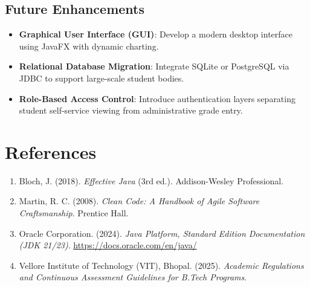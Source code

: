 \documentclass[12pt,a4paper]{report}
\begin{document}
\section{Future Enhancements}
\begin{itemize}
    \item \textbf{Graphical User Interface (GUI)}: Develop a modern desktop interface using JavaFX with dynamic charting.
    \item \textbf{Relational Database Migration}: Integrate SQLite or PostgreSQL via JDBC to support large-scale student bodies.
    \item \textbf{Role-Based Access Control}: Introduce authentication layers separating student self-service viewing from administrative grade entry.
\end{itemize}

\chapter*{References}

\begin{enumerate}
    \item Bloch, J. (2018). \textit{Effective Java} (3rd ed.). Addison-Wesley Professional.
    \item Martin, R. C. (2008). \textit{Clean Code: A Handbook of Agile Software Craftsmanship}. Prentice Hall.
    \item Oracle Corporation. (2024). \textit{Java Platform, Standard Edition Documentation (JDK 21/23)}. \url{https://docs.oracle.com/en/java/}
    \item Vellore Institute of Technology (VIT), Bhopal. (2025). \textit{Academic Regulations and Continuous Assessment Guidelines for B.Tech Programs}.
\end{enumerate}
\end{document}
